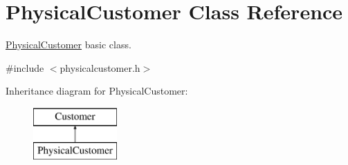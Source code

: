 \hypertarget{class_physical_customer}{\section{\-Physical\-Customer \-Class \-Reference}
\label{class_physical_customer}
}


\hyperlink{class_physical_customer}{\-Physical\-Customer} basic class.  




{\ttfamily \#include $<$physicalcustomer.\-h$>$}

\-Inheritance diagram for \-Physical\-Customer\-:\begin{figure}[H]
\begin{center}
\leavevmode
\includegraphics[height=2.000000cm]{class_physical_customer}
\end{center}
\end{figure}
